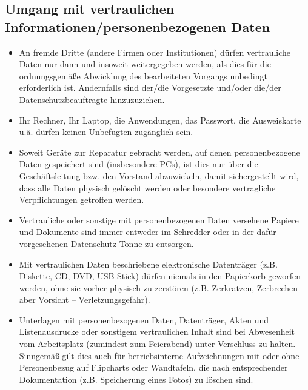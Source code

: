 \documentclass[a4paper, fontsize=11pt]{scrartcl}
\begin{document}
\subsection{Umgang mit vertraulichen Informationen/personenbezogenen Daten}
\begin{itemize}
  \item An fremde Dritte (andere Firmen oder Institutionen) dürfen vertrauliche Daten nur dann und insoweit weitergegeben werden, als dies für die ordnungsgemäße Abwicklung des bearbeiteten Vorgangs unbedingt erforderlich ist. Andernfalls sind der/die Vorgesetzte und/oder die/der Datenschutzbeauftragte hinzuzuziehen.
  \item Ihr Rechner, Ihr Laptop, die Anwendungen, das Passwort, die Ausweiskarte u.ä. dürfen keinen Unbefugten zugänglich sein.
  \item Soweit Geräte zur Reparatur gebracht werden, auf denen personenbezogene Daten gespeichert sind (insbesondere PCs), ist dies nur über die Geschäftsleitung bzw. den Vorstand abzuwickeln, damit sichergestellt wird, dass alle Daten physisch gelöscht werden oder besondere vertragliche Verpflichtungen getroffen werden.
  \item Vertrauliche oder sonstige mit personenbezogenen Daten versehene Papiere und Dokumente sind immer entweder im Schredder oder in der dafür vorgesehenen Datenschutz-Tonne zu entsorgen.
  \item Mit vertraulichen Daten beschriebene elektronische Datenträger (z.B. Diskette, CD, DVD, USB-Stick) dürfen niemals in den Papierkorb geworfen werden, ohne sie vorher physisch zu zerstören (z.B. Zerkratzen, Zerbrechen - aber Vorsicht – Verletzungsgefahr).
  \item Unterlagen mit personenbezogenen Daten, Datenträger, Akten und Listenausdrucke oder sonstigem vertraulichen Inhalt sind bei Abwesenheit vom Arbeitsplatz (zumindest zum Feierabend) unter Verschluss zu halten. Sinngemäß gilt dies auch für betriebsinterne Aufzeichnungen mit oder ohne Personenbezug auf Flipcharts oder Wandtafeln, die nach entsprechender Dokumentation (z.B. Speicherung eines Fotos) zu löschen sind.
\end{itemize}
\end{document}

